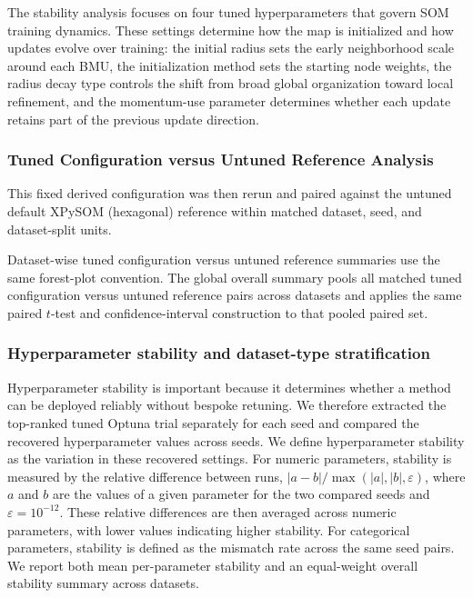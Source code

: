 \documentclass[11pt]{article}
\begin{document}
The stability analysis focuses on four tuned hyperparameters that govern SOM training dynamics. These settings determine how the map is initialized and how updates evolve over training: the initial radius sets the early neighborhood scale around each BMU, the initialization method sets the starting node weights, the radius decay type controls the shift from broad global organization toward local refinement, and the momentum-use parameter determines whether each update retains part of the previous update direction.

\subsubsection{Tuned Configuration versus Untuned Reference Analysis}

This fixed derived configuration was then rerun and paired against the untuned default XPySOM (hexagonal) reference within matched dataset, seed, and dataset-split units.

Dataset-wise tuned configuration versus untuned reference summaries use the same forest-plot convention. The global overall summary pools all matched tuned configuration versus untuned reference pairs across datasets and applies the same paired $t$-test and confidence-interval construction to that pooled paired set.

\subsubsection{Hyperparameter stability and dataset-type stratification}

Hyperparameter stability is important because it determines whether a method can be deployed reliably without bespoke retuning. We therefore extracted the top-ranked tuned Optuna trial separately for each seed and compared the recovered hyperparameter values across seeds. We define hyperparameter stability as the variation in these recovered settings. For numeric parameters, stability is measured by the relative difference between runs, $|a-b| / \max(|a|,|b|,\varepsilon)$, where $a$ and $b$ are the values of a given parameter for the two compared seeds and $\varepsilon=10^{-12}$. These relative differences are then averaged across numeric parameters, with lower values indicating higher stability. For categorical parameters, stability is defined as the mismatch rate across the same seed pairs. We report both mean per-parameter stability and an equal-weight overall stability summary across datasets.
\end{document}

